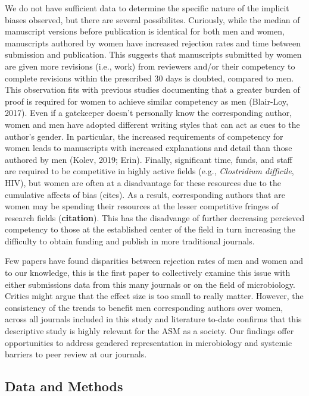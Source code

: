 \documentclass[11pt,]{article}
\begin{document}
We do not have sufficient data to determine the specific nature of the
implicit biases observed, but there are several possibilites. Curiously,
while the median of manuscript versions before publication is identical
for both men and women, manuscripts authored by women have increased
rejection rates and time between submission and publication. This
suggests that manuscripts submitted by women are given more revisions
(i.e., work) from reviewers and/or their competency to complete
revisions within the prescribed 30 days is doubted, compared to men.
This observation fits with previous studies documenting that a greater
burden of proof is required for women to achieve similar competency as
men (Blair-Loy, 2017). Even if a gatekeeper doesn't personally know the
corresponding author, women and men have adopted different writing
styles that can act as cues to the author's gender. In particular, the
increased requirements of competency for women leads to manuscripts with
increased explanations and detail than those authored by men (Kolev,
2019; Erin). Finally, significant time, funds, and staff are required to
be competitive in highly active fields (e.g., \emph{Clostridium
difficile}, HIV), but women are often at a disadvantage for these
resources due to the cumulative affects of bias (cites). As a result,
corresponding authors that are women may be spending their resources at
the lesser competitive fringes of research fields (\textbf{citation}).
This has the disadvange of further decreasing percieved competency to
those at the established center of the field in turn increasing the
difficulty to obtain funding and publish in more traditional journals.

Few papers have found disparities between rejection rates of men and
women and to our knowledge, this is the first paper to collectively
examine this issue with either submissions data from this many journals
or on the field of microbiology. Critics might argue that the effect
size is too small to really matter. However, the consistency of the
trends to benefit men corresponding authors over women, across all
journals included in this study and literature to-date confirms that
this descriptive study is highly relevant for the ASM as a society. Our
findings offer opportunities to address gendered representation in
microbiology and systemic barriers to peer review at our journals.

\subsection{Data and Methods}\label{data-and-methods}
\end{document}
